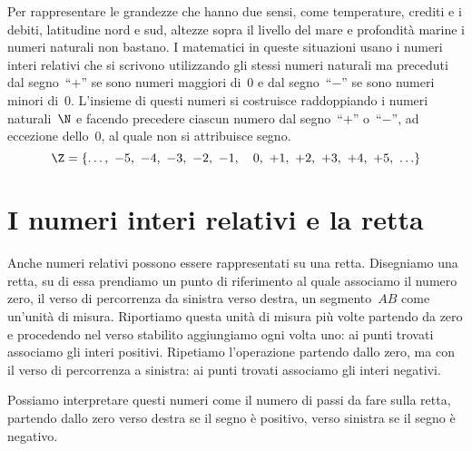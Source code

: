 Per rappresentare le grandezze che hanno due sensi, come temperature, 
crediti e i debiti, latitudine nord e sud, altezze sopra il livello del 
mare e profondità marine i numeri naturali non bastano. 
I matematici in queste situazioni usano i numeri interi relativi che si 
scrivono utilizzando gli stessi numeri naturali ma preceduti dal 
segno~``\(+\)'' se sono numeri maggiori di~0 e dal segno~``\(-\)'' se sono 
numeri minori di~0. L'insieme di questi numeri si costruisce raddoppiando 
i numeri naturali~\(\N\) e facendo precedere ciascun numero dal 
segno~``\(+\)'' o~``\(-\)'',
ad eccezione dello~0, al quale non si attribuisce segno.
\[ \Z=\lbrace\ldots,~ -5,~ -4,~ -3,~ -2,~ -1,~~~0,~ +1,~ +2,~ +3,~ +4,~ +5,~ 
\ldots \rbrace\]

\section{I numeri interi relativi e la retta}
\label{sec:int_retta}

Anche numeri relativi possono essere rappresentati su una retta. 
Disegniamo una retta, su di essa prendiamo un punto di riferimento al quale 
associamo il numero zero, il verso di percorrenza da sinistra verso destra,
un segmento~\(AB\) come un'unità di misura. 
Riportiamo questa unità di misura più volte partendo da zero e procedendo nel 
verso stabilito aggiungiamo ogni volta uno: ai punti trovati associamo gli 
interi positivi.
Ripetiamo l'operazione partendo dallo zero, ma con il verso di percorrenza 
a sinistra: ai punti trovati associamo gli interi negativi.

\begin{center}
\rettainteri
%  
\end{center}

Possiamo interpretare questi numeri come il numero di passi da fare sulla 
retta, partendo dallo zero verso destra se il segno è positivo, verso 
sinistra se il segno è negativo.


